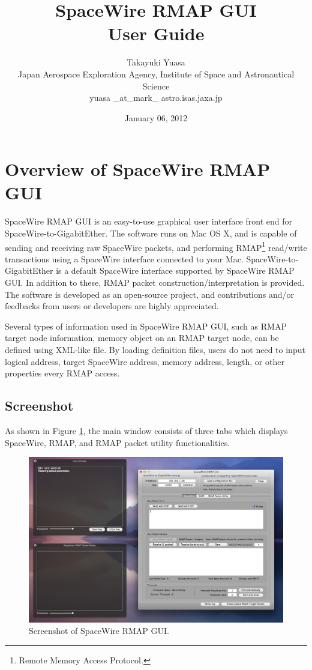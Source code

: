 \documentclass[a4paper,10pt]{article}
\title{\Huge{
SpaceWire RMAP GUI}\\
\Large{User Guide}}
\author{
{\Large
Takayuki Yuasa
}\\
{\small Japan Aerospace Exploration Agency, Institute of Space and Astronautical Science}\\
{\small yuasa \_at\_mark\_ astro.isas.jaxa.jp}\\
}
\date{January 06, 2012}
\begin{document}
\maketitle
\tableofcontents

\setcounter{page}{2}

\section{Overview of SpaceWire RMAP GUI}
SpaceWire RMAP GUI is an easy-to-use graphical user interface front end for SpaceWire-to-GigabitEther. The software runs on Mac OS X, and is capable of sending and receiving raw SpaceWire packets, and performing RMAP\footnote{Remote Memory Access Protocol.} read/write transactions using a SpaceWire interface connected to your Mac. SpaceWire-to-GigabitEther is a default SpaceWire interface supported by SpaceWire RMAP GUI. 
In addition to these, RMAP packet construction/interpretation is provided. The software is developed as an open-source project, and contributions and/or feedbacks from users or developers are highly appreciated.

Several types of information used in SpaceWire RMAP GUI, such as RMAP target node information, memory object on an RMAP target node, can be defined using XML-like file. By loading definition files, users do not need to input logical address, target SpaceWire address, memory address, length, or other properties every RMAP access.

\subsection{Screenshot}
As shown in Figure \ref{figure:tab_rmap}, the main window consists of three tabs which displays SpaceWire, RMAP, and RMAP packet utility functionalities.
\begin{figure}[htb]
\begin{center}
\includegraphics[width=15cm]{figures/SpaceWireRMAPGUI/Screenshot_all.png}
\caption{Screenshot of SpaceWire RMAP GUI.}
\label{figure:tab_rmap}
\end{center}
\end{figure}
\end{document}
